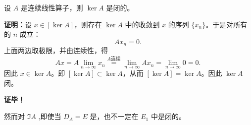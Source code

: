 \begin{theorem}{}
设 $A$ 是连续线性算子，则 $\ker A$ 是闭的。
\end{theorem}
\textbf{证明：}设 $x\in[\ker A]$，则存在 $\ker A$ 中的收敛到 $x$ 的序列 $\{x_n\}$。于是对所有的 $n$ 成立：
\begin{equation}
Ax_n=0.~
\end{equation}
 上面两边取极限，并由连续性，得 \begin{equation}
 Ax=A\lim_{n\rightarrow\infty}x_n\overset{A\text{连续}}{=}\lim_{n\rightarrow\infty}A x_n=\lim_{n\rightarrow\infty}0=0.~
 \end{equation}
 因此 $x\in\ker A$。即 $[\ker A]\subset\ker A$，从而 $[\ker A]=\ker A$。因此 $\ker A$ 闭。

\textbf{证毕！}

然而对 $\Im A$ ,即使当 $D_A=E$ 是，也不一定在 $E_1$ 中是闭的。








